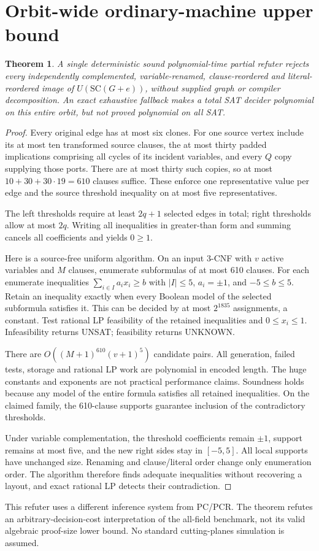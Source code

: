 \documentclass[11pt]{article}
\newtheorem{theorem}{Theorem}
\begin{document}
\section{Orbit-wide ordinary-machine upper bound}
\begin{theorem}
A single deterministic sound polynomial-time partial refuter rejects every independently complemented, variable-renamed, clause-reordered and literal-reordered image of $U(\mathrm{SC}(G+e))$, without supplied graph or compiler decomposition. An exact exhaustive fallback makes a total SAT decider polynomial on this entire orbit, but not proved polynomial on all SAT.
\end{theorem}
\begin{proof}
Every original edge has at most six clones. For one source vertex include its at most ten transformed source clauses, the at most thirty padded implications comprising all cycles of its incident variables, and every $Q$ copy supplying those ports. There are at most thirty such copies, so at most $10+30+30\cdot19=610$ clauses suffice. These enforce one representative value per edge and the source threshold inequality on at most five representatives.

The left thresholds require at least $2q+1$ selected edges in total; right thresholds allow at most $2q$. Writing all inequalities in greater-than form and summing cancels all coefficients and yields $0\ge1$.

Here is a source-free uniform algorithm. On an input 3-CNF with $v$ active variables and $M$ clauses, enumerate subformulas of at most 610 clauses. For each enumerate inequalities $\sum_{i\in I}a_ix_i\ge b$ with $|I|\le5$, $a_i=\pm1$, and $-5\le b\le5$. Retain an inequality exactly when every Boolean model of the selected subformula satisfies it. This can be decided by at most $2^{1835}$ assignments, a constant. Test rational LP feasibility of the retained inequalities and $0\le x_i\le1$. Infeasibility returns UNSAT; feasibility returns UNKNOWN.

There are $O((M+1)^{610}(v+1)^5)$ candidate pairs. All generation, failed tests, storage and rational LP work are polynomial in encoded length. The huge constants and exponents are not practical performance claims. Soundness holds because any model of the entire formula satisfies all retained inequalities. On the claimed family, the 610-clause supports guarantee inclusion of the contradictory thresholds.

Under variable complementation, the threshold coefficients remain $\pm1$, support remains at most five, and the new right sides stay in $[-5,5]$. All local supports have unchanged size. Renaming and clause/literal order change only enumeration order. The algorithm therefore finds adequate inequalities without recovering a layout, and exact rational LP detects their contradiction.
\end{proof}
This refuter uses a different inference system from PC/PCR. The theorem refutes an arbitrary-decision-cost interpretation of the all-field benchmark, not its valid algebraic proof-size lower bound. No standard cutting-planes simulation is assumed.
\end{document}
